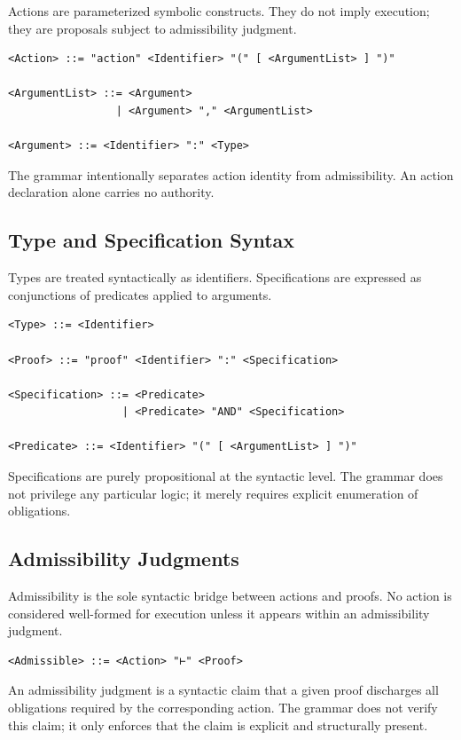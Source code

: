 \documentclass[11pt,oneside]{article}
\begin{document}
Actions are parameterized symbolic constructs. They do not imply execution; they are proposals subject to admissibility judgment.

\begin{verbatim}
<Action> ::= "action" <Identifier> "(" [ <ArgumentList> ] ")"

<ArgumentList> ::= <Argument>
                 | <Argument> "," <ArgumentList>

<Argument> ::= <Identifier> ":" <Type>
\end{verbatim}

The grammar intentionally separates action identity from admissibility. An action declaration alone carries no authority.

\subsection{Type and Specification Syntax}

Types are treated syntactically as identifiers. Specifications are expressed as conjunctions of predicates applied to arguments.

\begin{verbatim}
<Type> ::= <Identifier>

<Proof> ::= "proof" <Identifier> ":" <Specification>

<Specification> ::= <Predicate>
                  | <Predicate> "AND" <Specification>

<Predicate> ::= <Identifier> "(" [ <ArgumentList> ] ")"
\end{verbatim}

Specifications are purely propositional at the syntactic level. The grammar does not privilege any particular logic; it merely requires explicit enumeration of obligations.

\subsection{Admissibility Judgments}

Admissibility is the sole syntactic bridge between actions and proofs. No action is considered well-formed for execution unless it appears within an admissibility judgment.

\begin{verbatim}
<Admissible> ::= <Action> "⊢" <Proof>
\end{verbatim}

An admissibility judgment is a syntactic claim that a given proof discharges all obligations required by the corresponding action. The grammar does not verify this claim; it only enforces that the claim is explicit and structurally present.
\end{document}
